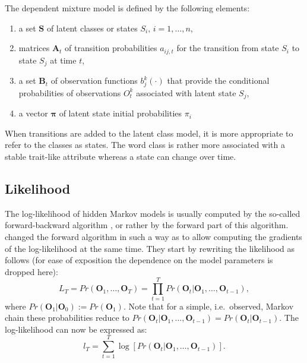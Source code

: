 \documentclass[a4paper]{article}
\newcommand{\vc}{\mathbf}
\newcommand{\mat}{\mathbf}
\begin{document}
The dependent mixture model is defined by the following elements:
\begin{enumerate}
	
	\item a set $\vc{S}$ of latent classes or states $S_{i},\, i=1,
	\ldots , n$,
	
	\item matrices $\mat{A}_t$ of transition probabilities $a_{ij,t}$ for
	the transition from state $S_{i}$ to state $S_{j}$ at time $t$,
	
	\item a set $\vc{B}_t$ of observation functions $b_j^k(\cdot)$ that
	provide the conditional probabilities of observations $O_{t}^k$ 
	associated with latent state $S_{j}$,
	
	\item a vector $\pmb{\pi}$ of latent state initial probabilities
	$\pi_{i}$
\end{enumerate}
When transitions are added to the latent class model, it is more 
appropriate to refer to the classes as states. The word class is 
rather more associated with a stable trait-like attribute whereas a 
state can change over time. 


\subsection{Likelihood}

The log-likelihood of hidden Markov models is usually computed by the
so-called forward-backward algorithm \citep{Baum1966,Rabiner1989}, or
rather by the forward part of this algorithm.  \cite{Lystig2002}
changed the forward algorithm in such a way as to allow computing the
gradients of the log-likelihood at the same time.  They start by
rewriting the likelihood as follows (for ease of exposition the
dependence on the model parameters is dropped here):
\begin{equation}
	L_{T} = Pr(\vc{O}_{1}, \ldots, \vc{O}_{T}) = \prod_{t=1}^{T} 
Pr(\vc{O}_{t}|\vc{O}_{1}, 
	\ldots, \vc{O}_{t-1}), 
	\label{condLike}
\end{equation}
where $Pr(\vc{O}_{1}|\vc{O}_{0}):=Pr(\vc{O}_{1})$. Note that for a 
simple, i.e.\ observed, Markov chain these probabilities reduce to 
$Pr(\vc{O}_{t}|\vc{O}_{1},\ldots, 
\vc{O}_{t-1})=Pr(\vc{O}_{t}|\vc{O}_{t-1})$.
The log-likelihood can now be expressed as:
\begin{equation}
	l_{T} = \sum_{t=1}^{T} \log[Pr(\vc{O}_{t}|\vc{O}_{1}, \ldots, 
\vc{O}_{t-1})].
	\label{eq:condLogl}
\end{equation}
\end{document}
